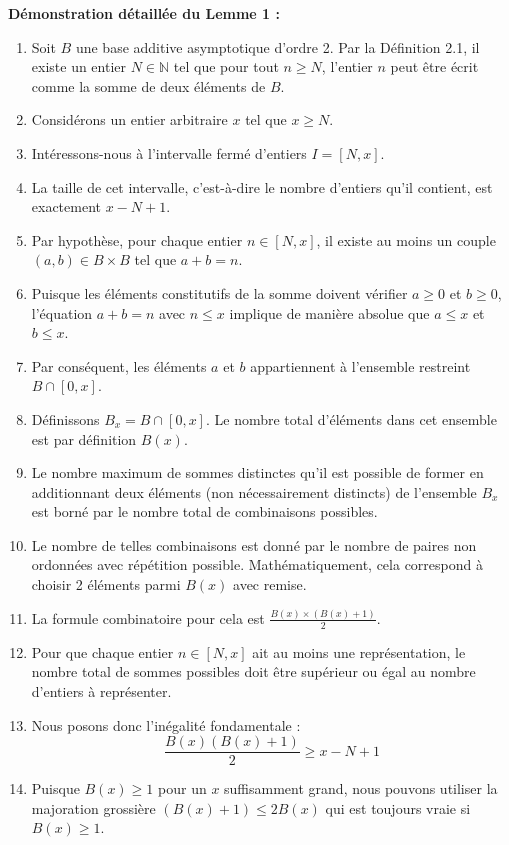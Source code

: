 \documentclass[12pt,a4paper]{article}
\begin{document}
\textbf{Démonstration détaillée du Lemme 1 :}
\begin{enumerate}
    \item Soit $B$ une base additive asymptotique d'ordre 2. Par la Définition 2.1, il existe un entier $N \in \mathbb{N}$ tel que pour tout $n \ge N$, l'entier $n$ peut être écrit comme la somme de deux éléments de $B$.
    \item Considérons un entier arbitraire $x$ tel que $x \ge N$.
    \item Intéressons-nous à l'intervalle fermé d'entiers $I = [N, x]$.
    \item La taille de cet intervalle, c'est-à-dire le nombre d'entiers qu'il contient, est exactement $x - N + 1$.
    \item Par hypothèse, pour chaque entier $n \in [N, x]$, il existe au moins un couple $(a, b) \in B \times B$ tel que $a + b = n$.
    \item Puisque les éléments constitutifs de la somme doivent vérifier $a \ge 0$ et $b \ge 0$, l'équation $a + b = n$ avec $n \le x$ implique de manière absolue que $a \le x$ et $b \le x$.
    \item Par conséquent, les éléments $a$ et $b$ appartiennent à l'ensemble restreint $B \cap [0, x]$.
    \item Définissons $B_x = B \cap [0, x]$. Le nombre total d'éléments dans cet ensemble est par définition $B(x)$.
    \item Le nombre maximum de sommes distinctes qu'il est possible de former en additionnant deux éléments (non nécessairement distincts) de l'ensemble $B_x$ est borné par le nombre total de combinaisons possibles.
    \item Le nombre de telles combinaisons est donné par le nombre de paires non ordonnées avec répétition possible. Mathématiquement, cela correspond à choisir 2 éléments parmi $B(x)$ avec remise.
    \item La formule combinatoire pour cela est $\frac{B(x) \times (B(x) + 1)}{2}$.
    \item Pour que chaque entier $n \in [N, x]$ ait au moins une représentation, le nombre total de sommes possibles doit être supérieur ou égal au nombre d'entiers à représenter.
    \item Nous posons donc l'inégalité fondamentale :
    $$\frac{B(x)(B(x) + 1)}{2} \ge x - N + 1$$
    \item Puisque $B(x) \ge 1$ pour un $x$ suffisamment grand, nous pouvons utiliser la majoration grossière $(B(x) + 1) \le 2B(x)$ qui est toujours vraie si $B(x) \ge 1$.

\end{enumerate}
\end{document}
